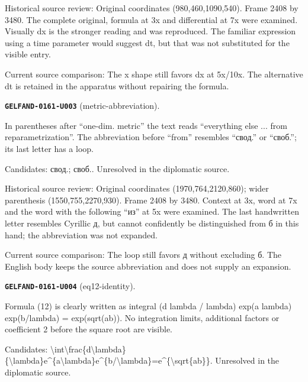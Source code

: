 Historical source review: Original coordinates (980,460,1090,540). Frame 2408 by 3480. The complete original, formula at 3x and differential at 7x were examined. Visually dx is the stronger reading and was reproduced. The familiar expression using a time parameter would suggest dt, but that was not substituted for the visible entry.\par
Current source comparison: The x shape still favors dx at 5x/10x. The alternative dt is retained in the apparatus without repairing the formula.\par\medskip
\par\noindent\leavevmode{}\label{GELFAND-0161-U003}\label{GELFAND-P001485:metric-abbreviation}\textbf{\texttt{GELFAND-0161-U003}} (metric-abbreviation).\nopagebreak[4]\par
In parentheses after “one-dim. metric” the text reads “everything else ... from reparametrization”. The abbreviation before “from” resembles “свод.” or “своб.”; its last letter has a loop.\par
Candidates: свод.; своб.. Unresolved in the diplomatic source.\par
Historical source review: Original coordinates (1970,764,2120,860); wider parenthesis (1550,755,2270,930). Frame 2408 by 3480. Context at 3x, word at 7x and the word with the following “из” at 5x were examined. The last handwritten letter resembles Cyrillic д, but cannot confidently be distinguished from б in this hand; the abbreviation was not expanded.\par
Current source comparison: The loop still favors д without excluding б. The English body keeps the source abbreviation and does not supply an expansion.\par\medskip
\par\noindent\leavevmode{}\label{GELFAND-0161-U004}\label{GELFAND-P001485:eq12-identity}\textbf{\texttt{GELFAND-0161-U004}} (eq12-identity).\nopagebreak[4]\par
Formula (12) is clearly written as integral (d lambda / lambda) exp(a lambda) exp(b/lambda) = exp(sqrt(ab)). No integration limits, additional factors or coefficient 2 before the square root are visible.\par
Candidates: \textbackslash{}int\textbackslash{}frac\{d\textbackslash{}lambda\}\{\textbackslash{}lambda\}e\textasciicircum{}\{a\textbackslash{}lambda\}e\textasciicircum{}\{b/\textbackslash{}lambda\}=e\textasciicircum{}\{\textbackslash{}sqrt\{ab\}\}. Unresolved in the diplomatic source.\par
